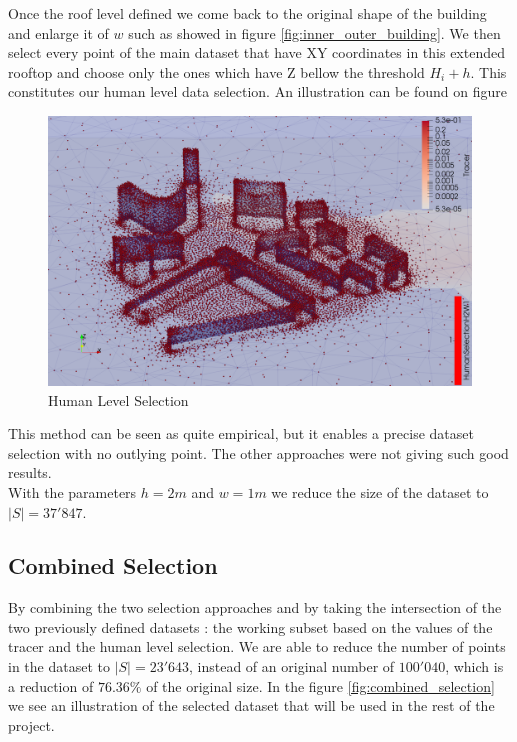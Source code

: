 Once the roof level defined we come back to the original shape of the building and enlarge it of $w$ such as showed in figure \ref{fig:inner_outer_building}. We then select every point of the main dataset that have XY coordinates in this extended rooftop and   choose only the ones which have Z bellow the threshold $H_i + h$. This constitutes our human level data selection. An illustration can be found on figure 

\begin{figure}[h!]
\centering
	\includegraphics[width = 0.8 \linewidth]{figures/Subset/HumanSelectionH2W1_zoom}
	\caption{Human Level Selection}
	\label{fig:human_selection}
\end{figure}

This method can be seen as quite empirical, but it enables a precise dataset selection with no outlying point. The other approaches were not giving such good results. \\

With the parameters $h = 2m$ and $w = 1m$ we reduce the size of the dataset to $|S| = 37'847$. 


\subsection{Combined Selection}

By combining the two selection approaches and by taking the intersection of the two previously defined datasets : the working subset based on the values of the tracer and the human level selection. We are able to reduce the number of points in the dataset to $|S| = 23'643$, instead of an original number of $100'040$, which is a reduction of $76.36\%$ of the original size. In the figure \ref{fig:combined_selection} we see an illustration of the selected dataset that will be used in the rest of the project. 

